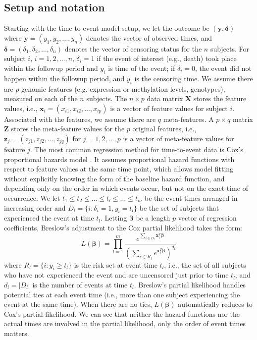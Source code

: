 \subsection{Setup and notation}
Starting with the time-to-event model setup, we let the outcome be $(\bm{y, \delta})$ where $\bm{y}=(y_1,y_2,\dots,y_n)$ denotes the vector of observed times, and $\bm{\delta}=(\delta_1,\delta_2,\dots,\delta_n)$ denotes the vector of censoring status for the $n$ subjects. For subject $i$, $i=1,2,\dots,n$, $\delta_i = 1$  if the event of interest (e.g., death) took place within the followup period and $y_i$ is time of the event; if $\delta_i=0$, the event did not happen within the followup period, and $y_i$ is the censoring time. We assume there are $p$ genomic features (e.g. expression or methylation levels, genotypes), measured on each of the $n$ subjects. The  $n\times p$ data matrix $\bm{X}$ stores the feature values, i.e., $\bm{x}_i = (x_{i1},x_{i2},\dots,x_{ip})$ is a vector of feature values for subject $i$. Associated with the features, we assume there are $q$ meta-features. A $p\times q$ matrix $\bm{Z}$ stores the meta-feature values for the $p$ original features, i.e., $\bm{z}_j = (z_{j1},z_{j2},\dots,z_{jq})$ for  $j=1,2,\dots,p$ is a vector of meta-feature values for feature $j$. The most common  regression method for time-to-event data is Cox's proportional hazards model \citep{cox1972regression}. It assumes proportional hazard functions with respect to feature values at the same time point, which allows model fitting without explicitly knowing the form of the baseline hazard function, and  depending only on the order in which events occur, but not on the exact time of occurrence. We let $t_1 \le t_2 \le \dots \le t_l \le \dots \le  t_m$ be the event times arranged in increasing order and $D_l=\{i:\delta_i=1,y_i=t_l\}$ be the set of subjects that experienced the event at time $t_l$. Letting $\bm{\beta}$ be a length $p$ vector of regression coefficients, Breslow's adjustment to the Cox partial likelihood \citep{breslow1972contribution} takes the form: 
\begin{displaymath}
L(\bm{\beta}) = \prod_{l=1}^{m} \frac{e^{\sum_{i\in D_l}\bm{x}_i^T\bm{\beta}}}{(\sum_{i\in R_l} e^{\bm{x}_i^T\bm{\beta}})^{d_l}}
\end{displaymath}
where $R_l=\{i: y_i\geq t_l\}$ is the risk set at event time $t_l$, i.e., the set of all subjects who have not experienced the event and are uncensored just prior to time $t_l$, and $d_l=|D_l|$ is the number of events at time $t_l$.  Breslow's partial likelihood handles potential ties at each event time (i.e., more than one subject experiencing the event at the same time). When there are no ties, $L(\bm{\beta})$ automatically reduces to Cox's partial likelihood. We can see that neither the hazard functions nor the actual times are involved in the partial likelihood, only the order of event times matters. 

